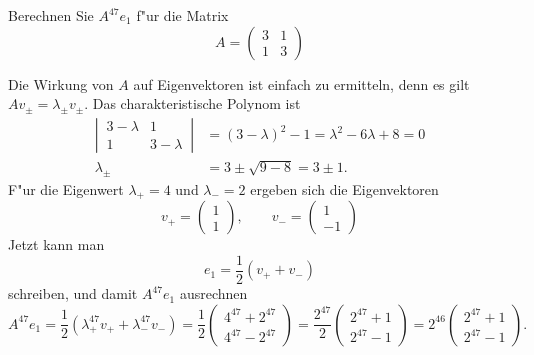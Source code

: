Berechnen Sie $A^{47}e_1$ f"ur die Matrix
\[
A=\begin{pmatrix}
3&1\\
1&3
\end{pmatrix}
\]

\begin{loesung}
Die Wirkung von $A$ auf Eigenvektoren ist einfach zu ermitteln,
denn es gilt $Av_{\pm}=\lambda_{\pm}v_{\pm}$.
Das charakteristische Polynom ist
\begin{align*}
\left|\,\begin{matrix}3-\lambda&1\\1&3-\lambda\end{matrix}\,\right|
&=
(3-\lambda)^2-1=\lambda^2-6\lambda+8=0
\\
\lambda_{\pm}&=3\pm\sqrt{9-8}=3\pm1.
\end{align*}
F"ur die Eigenwert $\lambda_+=4$ und $\lambda_-=2$ ergeben sich die
Eigenvektoren
\[
v_+=\begin{pmatrix}1\\1\end{pmatrix},\qquad
v_-=\begin{pmatrix}1\\-1\end{pmatrix}
\]
Jetzt kann man
\[
e_1=\frac12(v_++v_-)
\]
schreiben, und damit $A^{47}e_1$ ausrechnen
\[
A^{47}e_1=\frac12( \lambda_+^{47}v_++\lambda_-^{47}v_-)
=\frac12\begin{pmatrix}
4^{47}+2^{47}\\
4^{47}-2^{47}
\end{pmatrix}
=\frac{2^{47}}2\begin{pmatrix}
2^{47}+1\\
2^{47}-1
\end{pmatrix}
=2^{46}\begin{pmatrix}
2^{47}+1\\
2^{47}-1
\end{pmatrix}.
\]
\end{loesung}

